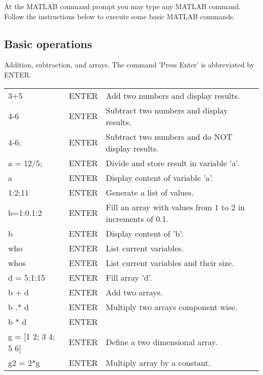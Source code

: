 At the MATLAB command prompt you may type any MATLAB command.  Follow the
instructions below to execute some basic MATLAB commands.
\vspace{0.25in}

\subsection{Basic operations} Addition, subtraction, and arrays.  The 
command 'Press Enter' is abbreviated by ENTER. \\
\vspace{1in}


\begin{tabular}{lll} 
  \ttt{>>} 3+5     &ENTER   &Add two numbers and display results. \\ 
  \ttt{>>} 4-6     &ENTER   &Subtract two numbers and display results. \\ 
  \ttt{>>} 4-6;    &ENTER   &Subtract two numbers and do NOT
  display results.\\
  \ttt{>>} a = 12/5; &ENTER   &Divide and store result in variable 'a'.\\
  \ttt{>>} a        &ENTER  &Display content of variable 'a'. \\
  \ttt{>>} 1:2:11   &ENTER  &Generate a list of values. \\
  \ttt{>>} b=1:0.1:2 &ENTER & Fill an array with values from 1 to
  2 in increments of 0.1.\\
  \ttt{>>} b          &ENTER & Display content of 'b'. \\
  \ttt{>>} who      &ENTER  &List current variables. \\
  \ttt{>>} whos     &ENTER  &List current variables and their size.\\
  \ttt{>>} d = 5:1:15 &ENTER &Fill array 'd'. \\
  \ttt{>>} b + d     &ENTER &Add two arrays. \\
  \ttt{>>} b .* d    &ENTER & Multiply two arrays component wise. \\
  \ttt{>>} b * d     &ENTER & \\ 
  \ttt{>>} g = [1 2; 3 4; 5 6] &ENTER &Define a two dimensional array. \\
  \ttt{>>} g2 = 2*g  &ENTER & Multiply array by a constant. \\
\end{tabular}

